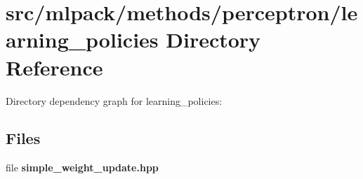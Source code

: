 \section{src/mlpack/methods/perceptron/learning\-\_\-policies Directory Reference}
\label{dir_83c113add47e749a90538be658ec31cd}
Directory dependency graph for learning\-\_\-policies\-:
\subsection*{Files}
\begin{DoxyCompactItemize}
\item 
file {\bf simple\-\_\-weight\-\_\-update.\-hpp}
\end{DoxyCompactItemize}
